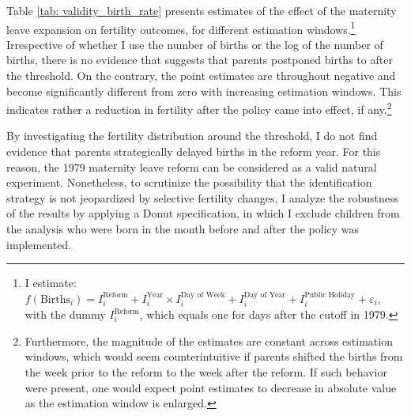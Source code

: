 \documentclass[11pt, a4paper]{article} %
\begin{document}
Table \ref{tab: validity_birth_rate} presents estimates of the effect of the maternity leave expansion on fertility outcomes, for different estimation windows.\footnote{I estimate: $f(\text{Births}_i) = I^{\text{Reform}}_i + I^{\text{Year}}_i\times I^{\text{Day of Week}}_i + I^{\text{Day of Year}}_i + I^{\text{Public Holiday}}_i + \varepsilon_i$, with the dummy $I^{\text{Reform}}_i$, which equals one for days after the cutoff in 1979.} Irrespective of whether I use the number of births or the log of the number of births, there is no evidence that suggests that parents postponed births to after the threshold. On the contrary, the point estimates are throughout negative and become significantly different from zero with increasing estimation windows. This indicates rather a reduction in fertility after the policy came into effect, if any.\footnote{Furthermore, the magnitude of the estimates are constant across estimation windows, which would seem counterintuitive if parents shifted the births from the week prior to the reform to the week after the reform. If such behavior were present, one would expect point estimates to decrease in absolute value as the estimation window is enlarged.} \newline 

By investigating the fertility distribution around the threshold, I do not find evidence that parents strategically delayed births in the reform year. For this reason, the 1979 maternity leave reform can be considered as a valid natural experiment. Nonetheless, to scrutinize the possibility that the identification strategy is not jeopardized by selective fertility changes, I analyze the robustness of the results by applying a Donut specification, in which I exclude children from the analysis who were born in the month before and after the policy was implemented.




	
\end{document}
